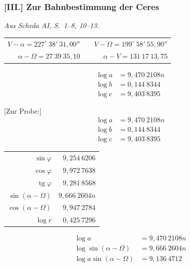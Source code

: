\documentclass[12pt,a4paper]{article}
\DeclareMathOperator{\tg}{tg}
\theoremstyle{plain}
\theoremstyle{definition}
\theoremstyle{remark}
\begin{document}
\newpage

\subsubsection*{[III.] Zur Bahnbestimmung der Ceres}

\textit{Aus Scheda AI, S.~1--8, 10--13.}

\medskip

\begin{center}
\begin{tabular}{r@{\quad}r@{\quad}r}
$V - \alpha = 227^\circ\ 38'\ 31{,}00''$ & & $V - \Omega = 199^\circ\ 58'\ 55{,}90''$ \\
$\alpha - \Omega = 27\ 39\ 35{,}10$ & & $\alpha - V = 131\ 17\ 13{,}75$
\end{tabular}
\end{center}

\begin{align*}
\log a &= 9{,}470\ 2108n \\
\log b &= 0{,}144\ 8344 \\
\log c &= 9{,}403\ 8395
\end{align*}

\newpage

[Zur Probe:]
\begin{align*}
\log a &= 9{,}470\ 2108n \\
\log b &= 0{,}144\ 8344 \\
\log c &= 9{,}403\ 8395
\end{align*}

\begin{center}
\begin{tabular}{r@{\quad}r}
$\sin\varphi$ & $9{,}254\ 6206$ \\
$\cos\varphi$ & $9{,}972\ 7638$ \\
$\tg\varphi$ & $9{,}281\ 8568$ \\
$\sin(\alpha - \Omega)$ & $9{,}666\ 2604n$ \\
$\cos(\alpha - \Omega)$ & $9{,}947\ 2784$ \\
$\log r$ & $0{,}425\ 7296$
\end{tabular}
\end{center}

\begin{align*}
\log a &= 9{,}470\ 2108n \\
\log \sin(\alpha - \Omega) &= 9{,}666\ 2604n \\
\log a \sin(\alpha - \Omega) &= 9{,}136\ 4712
\end{align*}
\end{document}

